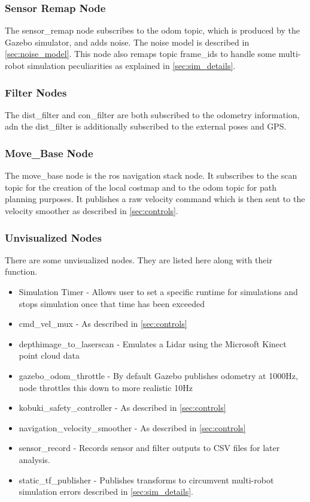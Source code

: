\documentclass[thesis.tex]{subfile}
\begin{document}
\subsubsection{Sensor Remap Node}
The sensor\_remap node subscribes to the odom topic, which is produced by the Gazebo simulator, and adds noise. The noise model is described in \autoref{sec:noise_model}. This node also remaps topic frame\_ids to handle some multi-robot simulation peculiarities as explained in \autoref{sec:sim_details}.

\subsubsection{Filter Nodes}
The \gls{dist_filter} and \gls{con_filter} are both subscribed to the odometry information, adn the \gls{dist_filter} is additionally subscribed to the external poses and GPS.

\subsubsection{Move\_Base Node}
The move\_base node is the \gls{ros} navigation stack node. It subscribes to the scan topic for the creation of the local costmap and to the odom topic for path planning purposes. It publishes a raw velocity command which is then sent to the velocity smoother as described in \autoref{sec:controls}.

\subsubsection{Unvisualized Nodes}
There are some unvisualized nodes. They are listed here along with their function.
\begin{itemize}
\item Simulation Timer - Allows user to set a specific runtime for simulations and stops simulation once that time has been exceeded
\item cmd\_vel\_mux - As described in \autoref{sec:controls}
\item depthimage\_to\_laserscan - Emulates a Lidar using the Microsoft Kinect point cloud data \cite{Rockey2016}
\item gazebo\_odom\_throttle - By default Gazebo publishes odometry at 1000Hz, node throttles this down to more realistic 10Hz
\item kobuki\_safety\_controller - As described in \autoref{sec:controls}
\item navigation\_velocity\_smoother - As described in \autoref{sec:controls}
\item sensor\_record - Records sensor and filter outputs to \gls{CSV} files for later analysis.
\item static\_tf\_publisher - Publishes transforms to circumvent multi-robot simulation errors described in \autoref{sec:sim_details}.
\end{itemize}
\end{document}
